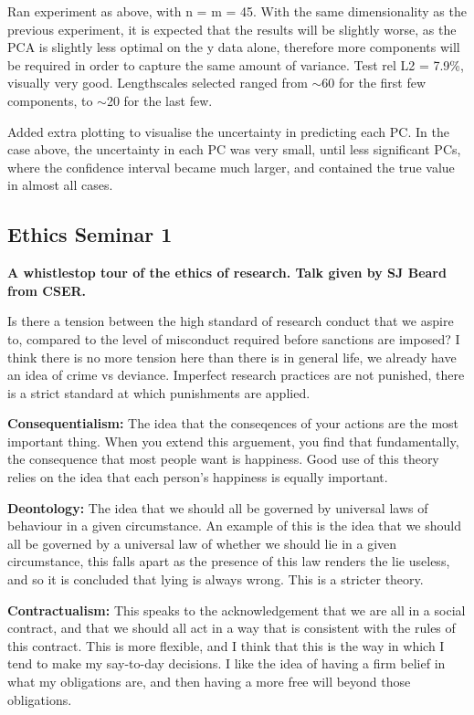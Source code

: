 \documentclass[11pt,a4paper]{article}
\begin{document}
Ran experiment as above, with n = m = 45.
With the same dimensionality as the previous experiment, it is expected that the results will be slightly worse, as the PCA is slightly less optimal on the y data alone, therefore more components will be required in order to capture the same amount of variance.
Test rel L2 = 7.9\%, visually very good.
Lengthscales selected ranged from $\sim$60 for the first few components, to $\sim$20 for the last few.

Added extra plotting to visualise the uncertainty in predicting each PC. 
In the case above, the uncertainty in each PC was very small, until less significant PCs, where the confidence interval became much larger, and contained the true value in almost all cases.

\subsection{Ethics Seminar 1}
\textbf{A whistlestop tour of the ethics of research. Talk given by SJ Beard from CSER.}

Is there a tension between the high standard of research conduct that we aspire to, compared to the level of misconduct required before sanctions are imposed?
I think there is no more tension here than there is in general life, we already have an idea of crime vs deviance. 
Imperfect research practices are not punished, there is a strict standard at which punishments are applied.

\textbf{Consequentialism:}
The idea that the conseqences of your actions are the most important thing.
When you extend this arguement, you find that fundamentally, the consequence that most people want is happiness.
Good use of this theory relies on the idea that each person's happiness is equally important.

\textbf{Deontology:}
The idea that we should all be governed by universal laws of behaviour in a given circumstance.
An example of this is the idea that we should all be governed by a universal law of whether we should lie in a given circumstance, this falls apart as the presence of this law renders the lie useless, and so it is concluded that lying is always wrong.
This is a stricter theory.

\textbf{Contractualism:}
This speaks to the acknowledgement that we are all in a social contract, and that we should all act in a way that is consistent with the rules of this contract.
This is more flexible, and I think that this is the way in which I tend to make my say-to-day decisions.
I like the idea of having a firm belief in what my obligations are, and then having a more free will beyond those obligations.
\end{document}

